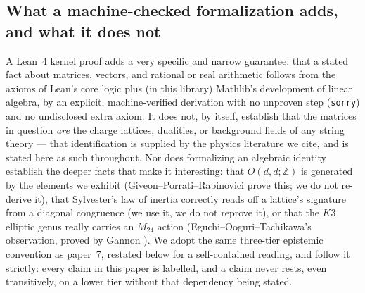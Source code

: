 \documentclass[11pt,a4paper]{article}
\theoremstyle{remark}
\begin{document}
\subsection{What a machine-checked formalization adds, and what it does not}
A Lean~4 kernel proof adds a very specific and narrow guarantee: that a stated fact about
matrices, vectors, and rational or real arithmetic follows from the axioms of Lean's core logic
plus (in this library) Mathlib's development of linear algebra, by an explicit, machine-verified
derivation with no unproven step (\texttt{sorry}) and no undisclosed extra axiom. It does not, by
itself, establish that the matrices in question \emph{are} the charge lattices, dualities, or
background fields of any string theory --- that identification is supplied by the physics
literature we cite, and is stated here as such throughout. Nor does formalizing an algebraic
identity establish the deeper facts that make it interesting: that $O(d,d;\mathbb{Z})$ is
generated by the elements we exhibit (Giveon--Porrati--Rabinovici prove this; we do not
re-derive it), that Sylvester's law of inertia correctly reads off a lattice's signature from a
diagonal congruence (we use it, we do not reprove it), or that the $K3$ elliptic genus really
carries an $M_{24}$ action (Eguchi--Ooguri--Tachikawa's observation, proved by Gannon
\cite{Gannon2016}). We adopt the same three-tier epistemic convention as paper~7, restated below
for a self-contained reading, and follow it strictly: every claim in this paper is labelled, and
a claim never rests, even transitively, on a lower tier without that dependency being stated.
\end{document}
